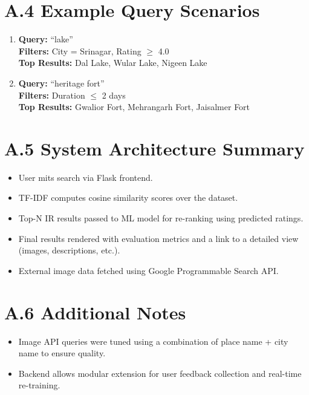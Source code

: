 \documentclass[12pt,a4paper]{article}
\begin{document}
\section*{A.4 Example Query Scenarios}
\begin{enumerate}
    \item \textbf{Query:} ``lake'' \\
    \textbf{Filters:} City = Srinagar, Rating $\geq$ 4.0 \\
    \textbf{Top Results:} Dal Lake, Wular Lake, Nigeen Lake

    \item \textbf{Query:} ``heritage fort'' \\
    \textbf{Filters:} Duration $\leq$ 2 days \\
    \textbf{Top Results:} Gwalior Fort, Mehrangarh Fort, Jaisalmer Fort
\end{enumerate}

\section*{A.5 System Architecture Summary}
\begin{itemize}
    \item User mits search via Flask frontend.
    \item TF-IDF computes cosine similarity scores over the dataset.
    \item Top-N IR results passed to ML model for re-ranking using predicted ratings.
    \item Final results rendered with evaluation metrics and a link to a detailed view (images, descriptions, etc.).
    \item External image data fetched using Google Programmable Search API.
\end{itemize}

\section*{A.6 Additional Notes}
\begin{itemize}
    \item Image API queries were tuned using a combination of place name + city name to ensure quality.
    \item Backend allows modular extension for user feedback collection and real-time re-training.
\end{itemize}
\end{document}
